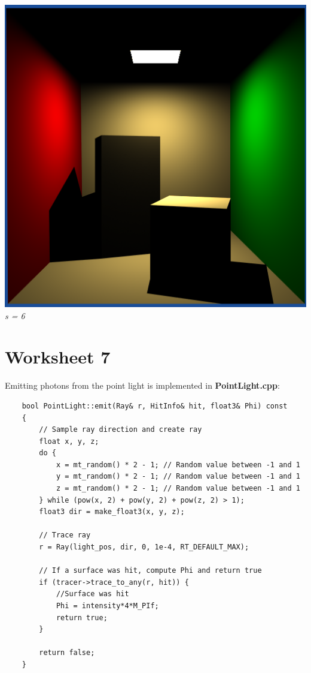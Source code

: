 \documentclass[a4,12pt]{article}
\begin{document}
\begin{center}
\begin{minipage}[b]{0.40\linewidth}
\begin{center}
				\includegraphics[width = \textwidth]{./Worksheet6/cornellblocks6.png}\\
				\textit{s = 6}
			\end{center}
		\end{minipage}
	\end{center}
	
	\section{Worksheet 7}
	Emitting photons from the point light is implemented in \textbf{PointLight.cpp}:
	
	\begin{lstlisting}
	bool PointLight::emit(Ray& r, HitInfo& hit, float3& Phi) const
	{		
		// Sample ray direction and create ray
		float x, y, z;
		do {
			x = mt_random() * 2 - 1; // Random value between -1 and 1
			y = mt_random() * 2 - 1; // Random value between -1 and 1
			z = mt_random() * 2 - 1; // Random value between -1 and 1
		} while (pow(x, 2) + pow(y, 2) + pow(z, 2) > 1);
		float3 dir = make_float3(x, y, z);
		
		// Trace ray
		r = Ray(light_pos, dir, 0, 1e-4, RT_DEFAULT_MAX);
		
		// If a surface was hit, compute Phi and return true
		if (tracer->trace_to_any(r, hit)) {
			//Surface was hit
			Phi = intensity*4*M_PIf;
			return true;
		}
		
		return false;
	}
	\end{lstlisting}
	
\end{document}
